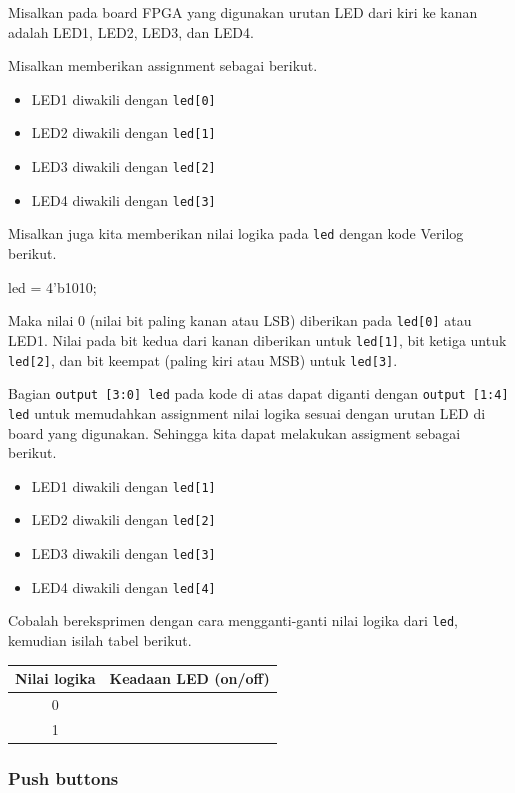 \documentclass[a4paper,12pt,bahasa]{extarticle}
\begin{document}
Misalkan pada board FPGA yang digunakan urutan LED dari kiri ke kanan adalah LED1,
LED2, LED3, dan LED4.

Misalkan memberikan assignment sebagai berikut.
\begin{itemize}
\item LED1 diwakili dengan {\tt led[0]}
\item LED2 diwakili dengan {\tt led[1]}
\item LED3 diwakili dengan {\tt led[2]}
\item LED4 diwakili dengan {\tt led[3]}
\end{itemize}


Misalkan juga kita memberikan nilai logika pada {\tt led} dengan
kode Verilog berikut.
\begin{verilogcode}
  led = 4'b1010;
\end{verilogcode}
Maka nilai 0 (nilai bit paling kanan atau LSB) diberikan pada {\tt led[0]}
atau LED1. Nilai pada bit kedua dari kanan diberikan untuk {\tt led[1]}, bit ketiga
untuk {\tt led[2]}, dan bit keempat (paling kiri atau MSB) untuk {\tt led[3]}.

Bagian {\tt output [3:0] led} pada kode di atas dapat diganti
dengan {\tt output [1:4] led} untuk memudahkan assignment nilai logika
sesuai dengan urutan LED di board yang digunakan. Sehingga kita dapat
melakukan assigment sebagai berikut.
\begin{itemize}
\item LED1 diwakili dengan {\tt led[1]}
\item LED2 diwakili dengan {\tt led[2]}
\item LED3 diwakili dengan {\tt led[3]}
\item LED4 diwakili dengan {\tt led[4]}
\end{itemize}


Cobalah bereksprimen dengan cara mengganti-ganti nilai logika
dari {\tt led}, kemudian isilah tabel berikut.

\begin{table}[H]
\centering
\begin{tabular}{|c|c|}
\hline
Nilai logika & Keadaan LED (on/off) \\
\hline
0 & \\
1 & \\
\hline
\end{tabular}
\par
\end{table}


\subsubsection{Push buttons}
\end{document}
